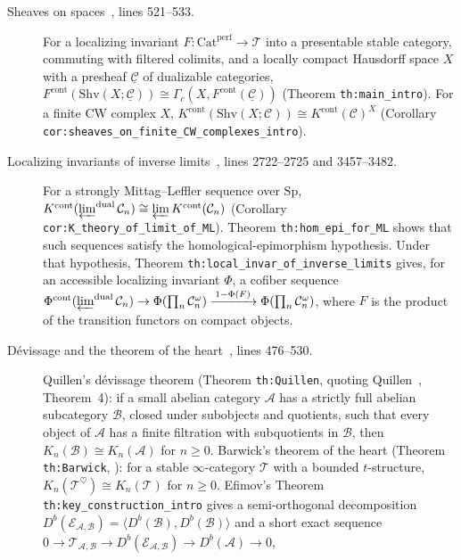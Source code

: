 \begin{description}
\item[Sheaves on spaces~\cite{EfimovContinuousK}, lines 521--533.]
For a localizing invariant $F\colon\mathrm{Cat}^{\mathrm{perf}}\to\mathcal T$ into a presentable
stable category, commuting with filtered colimits, and a locally compact Hausdorff space $X$
with a presheaf $\underline{\mathcal C}$ of dualizable categories,
$F^{\mathrm{cont}}(\mathrm{Shv}(X;\underline{\mathcal C}))\cong\Gamma_c(X,F^{\mathrm{cont}}(\underline{\mathcal C}))$
(Theorem \texttt{th:main\_intro}).  For a finite CW complex $X$,
$K^{\mathrm{cont}}(\mathrm{Shv}(X;\mathcal C))\cong K^{\mathrm{cont}}(\mathcal C)^X$
(Corollary \texttt{cor:sheaves\_on\_finite\_CW\_complexes\_intro}).
\item[Localizing invariants of inverse limits~\cite{EfimovInverseLimits}, lines 2722--2725 and 3457--3482.]
For a strongly Mittag--Leffler sequence over $\mathrm{Sp}$,
$K^{\mathrm{cont}}(\varprojlim^{\mathrm{dual}}\mathcal C_n)\cong\varprojlim K^{\mathrm{cont}}(\mathcal C_n)$
(Corollary \texttt{cor:K\_theory\_of\_limit\_of\_ML}).  Theorem \texttt{th:hom\_epi\_for\_ML} shows that
such sequences satisfy the homological-epimorphism hypothesis.  Under that hypothesis,
Theorem \texttt{th:local\_invar\_of\_inverse\_limits} gives, for an accessible localizing
invariant $\Phi$, a cofiber sequence
$\Phi^{\mathrm{cont}}(\varprojlim^{\mathrm{dual}}\mathcal C_n)\to\Phi(\prod_n\mathcal C_n^{\omega})
\xrightarrow{\,1-\Phi(F)\,}\Phi(\prod_n\mathcal C_n^{\omega})$,
where $F$ is the product of the transition functors on compact objects.
\item[Dévissage and the theorem of the heart~\cite{EfimovDevissage}, lines 476--530.]
Quillen's dévissage theorem (Theorem \texttt{th:Quillen}, quoting Quillen~\cite{Quillen}, Theorem~4):
if a small abelian category $\mathcal A$ has a strictly full abelian subcategory $\mathcal B$,
closed under subobjects and quotients, such that every object of $\mathcal A$ has a finite
filtration with subquotients in $\mathcal B$, then $K_n(\mathcal B)\cong K_n(\mathcal A)$ for $n\ge0$.
Barwick's theorem of the heart (Theorem \texttt{th:Barwick}, \cite{Barwick}): for a stable
$\infty$-category $\mathcal T$ with a bounded $t$-structure, $K_n(\mathcal T^\heartsuit)\cong K_n(\mathcal T)$
for $n\ge0$.  Efimov's Theorem \texttt{th:key\_construction\_intro} gives a semi-orthogonal decomposition
$D^b(\mathcal E_{\mathcal A,\mathcal B})=\langle D^b(\mathcal B),D^b(\mathcal B)\rangle$ and a short exact sequence
$0\to\mathcal T_{\mathcal A,\mathcal B}\to D^b(\mathcal E_{\mathcal A,\mathcal B})\to D^b(\mathcal A)\to0$,

\end{description}
